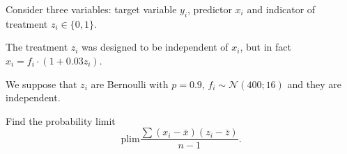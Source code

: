 
\begin{question}
Consider three variables: target variable \(y_i\), predictor \(x_i\) and indicator of treatment \(z_i \in \{0,1\}\).

The treatment \(z_i\) was designed to be independent of \(x_i\), but in fact \(x_i = f_i \cdot (1 + 0.03 z_i)\).

We suppose that \(z_i\) are Bernoulli with \(p=0.9\), \(f_i \sim \mathcal{N}(400;16)\) and they are independent.

Find the probability limit
\[
    \mathrm{plim} \frac{\sum (x_i - \bar x)(z_i - \bar z)}{n-1}.    
\]
\end{question}



